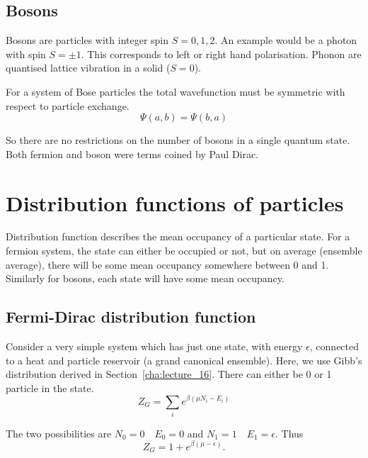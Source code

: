 \documentclass[12pt,chapterprefix=false,dvipsnames]{scrbook}
\theoremstyle{dotless}
\theoremstyle{definition}
\begin{document}
\subsection{Bosons}%
\label{sub:bosons}

Bosons are particles with integer spin $S = 0, 1, 2$.
An example would be a photon with spin $ S = \pm 1 $.
This corresponds to left or right hand polarisation. Phonon are
quantised lattice vibration in a solid
($S = 0$).

For a system of Bose particles the total wavefunction must be
symmetric with respect to particle exchange.
\begin{equation}
	\Psi\left(a,b\right) =
	\Psi\left(b,a\right)
\end{equation}

So there are no restrictions on the number of bosons in a single
quantum state. Both fermion and boson were terms coined by Paul
Dirac.

\section{Distribution functions of particles}%
\label{sec:distribution_functions_of_particles}

Distribution function describes the mean occupancy of a
particular state. For a fermion system, the state can either be
occupied or not, but on average (ensemble average), there will
be some mean occupancy somewhere between 0 and 1. Similarly for
bosons, each state will have some mean occupancy.

\subsection{Fermi-Dirac distribution function}%
\label{sub:fermi_dirac_distribution_function}

Consider a very simple system which has just one state, with
energy $\epsilon$, connected to a heat and particle
reservoir (a grand canonical ensemble). Here, we use Gibb's
distribution derived in Section~\ref{cha:lecture_16}. There
can either be 0 or 1 particle in the state.
\begin{equation}
	Z_G = \sum_i e^{\beta \left(\mu N_i - E_i\right)}
\end{equation}

The two possibilities are $N_0 = 0\hspace{1em} E_0 = 0$ and
$N_1 = 1 \hspace{1em} E_1 = \epsilon$. Thus
\begin{equation}
	Z_G = 1 + e^{\beta\left( \mu - \epsilon\right)}.
\end{equation}
\end{document}
